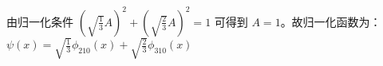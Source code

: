 
\begin{issues}
\issueDraft
\issueTODO
\end{issues}

\subsection{ }
由归一化条件 $\displaystyle (\sqrt{\frac{1}{3}}A)^{2} + (\sqrt{\frac{2}{3}}A)^{2} = 1 $ 可得到 $A=1$。故归一化函数为：\\

$\displaystyle \psi(x) = \sqrt{\frac{1}{3}}\phi_{210}(x)+\sqrt{\frac{2}{3}} \phi_{310}(x)$ \\

\subsection{ }

